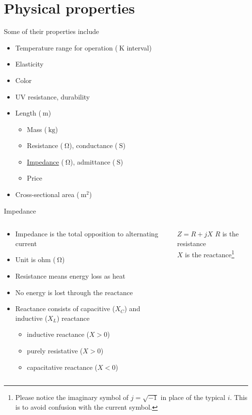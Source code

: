 \documentclass{beamer}
\begin{document}
\section{Physical properties}

\begin{frame}{Some of their properties include}
 \begin{itemize}
  \item Temperature range for operation ($\SI{}{\kelvin}$ interval)
  \item Elasticity
  \item Color
  \item UV resistance, durability
  \item Length ($\SI{}{\meter}$)
   \begin{itemize}
    \item Mass ($\SI{}{\kilo\gram}$)
    \item Resistance ($\SI{}{\ohm}$), conductance ($\SI{}{\siemens}$)
    \item \hyperlink{impedance}{Impedance} ($\SI{}{\ohm}$), admittance ($\SI{}{\siemens}$)
    \item Price
   \end{itemize}
  \item Cross-sectional area ($\SI{}{\meter^2}$)~\cite{iec2004}
 \end{itemize}
\end{frame}

\begin{frame}[label=impedance]{Impedance}
\begin{columns}
  \begin{column}{0.58\textwidth}
   \begin{itemize}
    \item Impedance is the total opposition to alternating current
    \item Unit is ohm ($\SI{}{\ohm}$)
    \item Resistance means energy loss as heat
    \item No energy is lost through the reactance
    \item Reactance consists of capacitive ($X_C$) and inductive ($X_L$) reactance
     \begin{itemize}
      \item inductive reactance ($X > 0$)
      \item purely resistative ($X > 0$)
      \item capacitative reactance ($X < 0$)
     \end{itemize}
   \end{itemize}
  \end{column}
  \begin{column}{0.38\textwidth}
    \begin{block}{$Z = R + jX$}
        $R$ is the resistance \\
        $X$ is the reactance\footnote{Please notice the imaginary symbol of $j = \sqrt{-1}$ in place of the typical $i$. This is to avoid confusion with the current symbol.}
    \end{block}
  \end{column}
\end{columns}
\end{frame}
\end{document}
